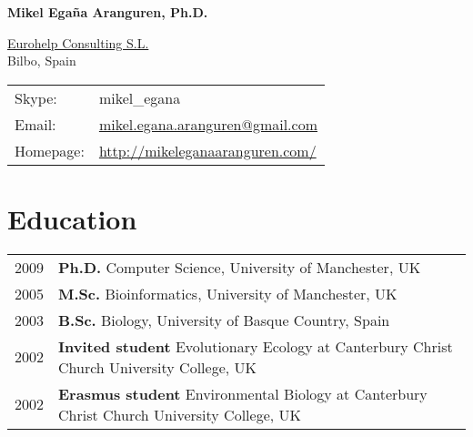 \documentclass[11pt,fullpage]{article}
\newcommand{\etc}{\emph{etc.}}
\def\name{Mikel Ega\~na Aranguren, Ph.D.}
\begin{document}


\centerline{\Large \bf \name}

\vspace{0.25in}

\begin{minipage}{0.50\linewidth}
    \href{http://eurohelp.es/}{Eurohelp Consulting S.L.} \\
    Bilbo, Spain \\

\end{minipage}
\begin{minipage}{0.50\linewidth}
  \begin{tabular}{ll}
    Skype: & mikel\_egana \\
    Email: & \href{mailto:mikel.egana.aranguren@gmail.com}{mikel.egana.aranguren@gmail.com} \\
    Homepage: & \href{http://mikeleganaaranguren.com/}{http://mikeleganaaranguren.com/} 
    
  \end{tabular}
\end{minipage}

\section*{Education}

\begin{tabular}{ll} 
	2009 & {\bf Ph.D.} Computer Science, University of Manchester, UK \\
	2005 & {\bf M.Sc.} Bioinformatics, University of Manchester, UK \\
	2003 & {\bf B.Sc.} Biology, University of Basque Country, Spain \\
	2002 & {\bf Invited student} Evolutionary Ecology at Canterbury Christ Church University College, UK \\
	2002 & {\bf Erasmus student} Environmental Biology at Canterbury Christ Church University College, UK \\
\end{tabular}
\end{document}
